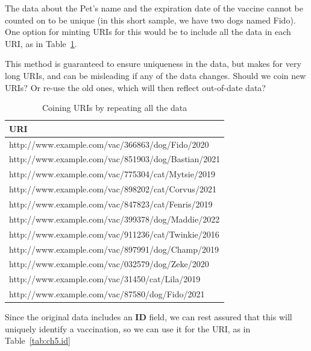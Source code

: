 The data about the Pet's name and the expiration date of the vaccine cannot be counted on to be  unique
(in this short sample, we have two dogs named Fido).  One option for minting URIs for this would be to include all the data in each URI, as in Table~\ref{tab:ch5.all}.

This method is guaranteed to ensure uniqueness in the data, but makes for very long URIs, and can be misleading if any of the data changes.  Should we coin new URIs?  Or re-use the old ones, which will then reflect out-of-date data?

\begin{table}
    \centering
    \begin{tabular}{|l|}
    \hline
    URI \\
    \hline\hline
http://www.example.com/vac/366863/dog/Fido/2020 \\
http://www.example.com/vac/851903/dog/Bastian/2021 \\
http://www.example.com/vac/775304/cat/Mytsie/2019 \\
http://www.example.com/vac/898202/cat/Corvus/2021 \\
http://www.example.com/vac/847823/cat/Fenris/2019 \\
http://www.example.com/vac/399378/dog/Maddie/2022 \\
http://www.example.com/vac/911236/cat/Twinkie/2016 \\
http://www.example.com/vac/897991/dog/Champ/2019 \\
http://www.example.com/vac/032579/dog/Zeke/2020 \\
http://www.example.com/vac/31450/cat/Lila/2019 \\
http://www.example.com/vac/87580/dog/Fido/2021 \\
\hline
    \end{tabular}
    \caption{Coining URIs by repeating all the data }
    \label{tab:ch5.all}
\end{table}

Since the original data includes an \textbf{ID} field, we can rest assured that this 
will uniquely identify a vaccination, so we can use it for the URI, as in Table~\ref{tab:ch5.id}

